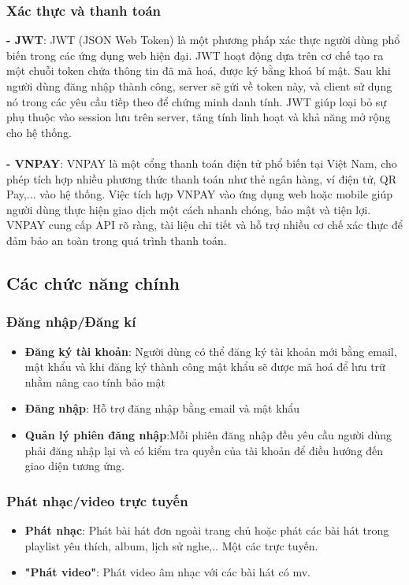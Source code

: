 \documentclass[a4paper,12pt]{article}
\begin{document}
\subsubsection{Xác thực và thanh toán}
\textbf{- JWT}: JWT (JSON Web Token) là một phương pháp xác thực người dùng phổ biến trong các ứng dụng web hiện đại. JWT hoạt động dựa trên cơ chế tạo ra một chuỗi token chứa thông tin đã mã hoá, được ký bằng khoá bí mật. Sau khi người dùng đăng nhập thành công, server sẽ gửi về token này, và client sử dụng nó trong các yêu cầu tiếp theo để chứng minh danh tính. JWT giúp loại bỏ sự phụ thuộc vào session lưu trên server, tăng tính linh hoạt và khả năng mở rộng cho hệ thống.\\ \\
\textbf{- VNPAY}: VNPAY là một cổng thanh toán điện tử phổ biến tại Việt Nam, cho phép tích hợp nhiều phương thức thanh toán như thẻ ngân hàng, ví điện tử, QR Pay,... vào hệ thống. Việc tích hợp VNPAY vào ứng dụng web hoặc mobile giúp người dùng thực hiện giao dịch một cách nhanh chóng, bảo mật và tiện lợi. VNPAY cung cấp API rõ ràng, tài liệu chi tiết và hỗ trợ nhiều cơ chế xác thực để đảm bảo an toàn trong quá trình thanh toán.
\subsection{Các chức năng chính}
\subsubsection{Đăng nhập/Đăng kí}
\begin{itemize}
    \item\textbf{Đăng ký tài khoản}: Người dùng có thể đăng ký tài khoản mới bằng email, mật khẩu và khi đăng ký thành công mật khẩu sẽ được mã hoá để lưu trữ nhằm nâng cao tính bảo mật 
    \item \textbf{Đăng nhập}: Hỗ trợ đăng nhập bằng email và mật khẩu  
    \item \textbf{Quản lý phiên đăng nhập}:Mỗi phiên đăng nhập đều yêu cầu người dùng phải đăng nhập lại và có kiểm tra quyền của tài khoản để điều hướng đến giao diện tương ứng.
\end{itemize}
\subsubsection{Phát nhạc/video trực tuyến}
\begin{itemize}
    \item \textbf{Phát nhạc}: Phát bài hát đơn ngoài trang chủ hoặc phát các bài hát trong playlist yêu thích, album, lịch sử nghe,.. Một các trực tuyến.
    \item \textbf{"Phát video"}: Phát video âm nhạc với các bài hát có mv.
\end{itemize}
\end{document}
